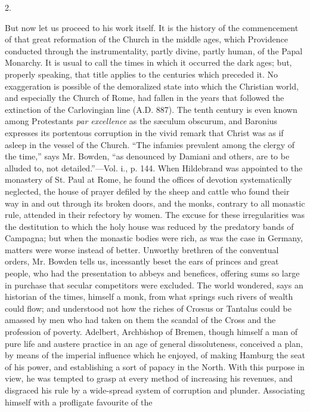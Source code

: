 2.

But now let us proceed to his work itself. It is
the history of the commencement of that great reformation of the
Church in the middle ages, which Providence conducted through the
instrumentality, partly divine, partly human, of the Papal Monarchy.
It is usual to call the times in which it occurred the dark
ages; but, properly speaking, that title applies to the centuries
which preceded it. No exaggeration is possible of the demoralized
state into which the Christian world, and especially the Church of
Rome, had fallen in the years that followed the extinction of the
Carlovingian line (A.D. 887).
The tenth century is even known among Protestants \emph{par excellence}
as the sæculum obscurum, and Baronius expresses its portentous
corruption in the vivid remark that Christ was as if asleep in the
vessel of the Church. ``The infamies prevalent among the clergy of the
time,'' says Mr. Bowden, ``as denounced by Damiani and others, are to be
alluded to, not detailed.''—Vol. i., p. 144. When Hildebrand was
appointed to the monastery of St. Paul at Rome, he found the offices
of devotion systematically neglected, the house of prayer defiled by
the sheep and cattle who found their way in and out through its broken
doors, and the monks, contrary to all monastic rule, attended in their
refectory by women. The excuse for these irregularities was the
destitution to which the holy house was reduced by the predatory bands
of Campagna; but when the monastic bodies were rich, as was the case
in Germany, matters were worse instead of better. Unworthy brethren of
the conventual orders, Mr. Bowden tells us, incessantly beset the ears
of princes and great people, who had the presentation to abbeys and
benefices, offering sums so large in purchase that secular competitors
were excluded. The world wondered, says an historian of the times,
himself a monk, from what springs such rivers of wealth could flow;
and understood not how the riches of Crœsus or Tantalus could be
amassed by men who had taken on them the scandal of the Cross and the
profession of poverty. Adelbert, Archbishop of Bremen, though himself
a man of pure life and austere practice in an age of general
dissoluteness, conceived a plan, by means of the imperial influence
which he enjoyed, of making Hamburg the seat of his power, and
establishing a sort of papacy in the North. With this purpose in view,
he was tempted to grasp at every method of increasing his revenues,
and disgraced his rule by a wide-spread system of corruption and
plunder. Associating himself with a profligate favourite of the
